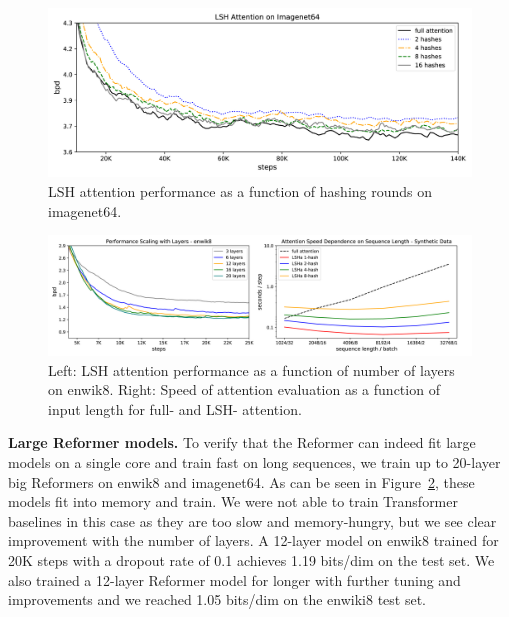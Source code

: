 \documentclass{article} %
\renewcommand{\paragraph}[1]{\textbf{#1}}
\begin{document}
\begin{figure}[!t]
    \centering
    \includegraphics[width=1.0\textwidth]{figures/hash_plot.png}
    \caption{LSH attention performance as a function of hashing rounds on imagenet64.}
    \label{fig:hash-curves}
\end{figure}

\begin{figure}[!t]
    \centering
    \includegraphics[width=1.0\textwidth]{figures/merge_depth_speed.png}
    \caption{Left: LSH attention performance as a function of number of layers on enwik8. 
    Right: Speed of attention evaluation as a function of input length for full- and LSH- attention.}
    \label{fig:layer-curves}
\end{figure}


\paragraph{Large Reformer models.} \label{sec:exp_large}
To verify that the Reformer can indeed fit large models on a single core
and train fast on long sequences, we train up to 20-layer big Reformers on enwik8 and imagenet64.
As can be seen in Figure~\ref{fig:layer-curves}, these models
fit into memory and train. We were not able to train Transformer baselines
in this case as they are too slow and memory-hungry, but we see clear improvement
with the number of layers. A 12-layer model on enwik8 trained for 20K steps with a dropout rate of 0.1 achieves 1.19 bits/dim on the test set. We also trained a 12-layer Reformer model for longer with
further tuning and improvements and we reached 1.05 bits/dim on the enwiki8 test
set.
\end{document}
